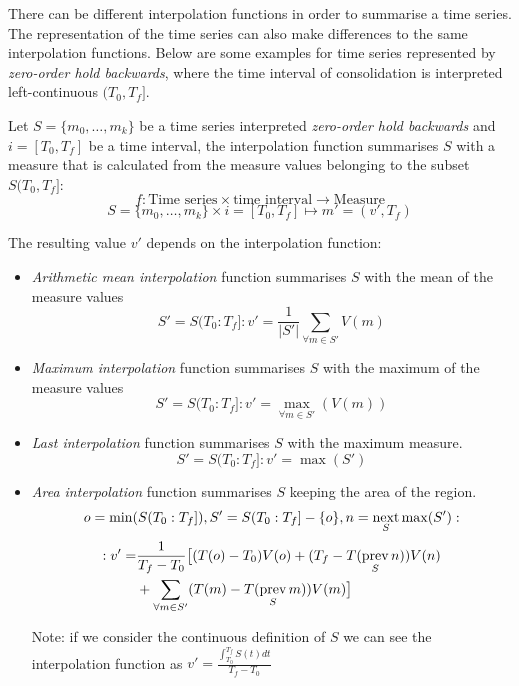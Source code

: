 There can be different interpolation functions in order to summarise a
time series. The representation of the time series can also make
differences to the same interpolation functions. Below are some
examples for time series represented by \emph{zero-order hold
  backwards}, where the time interval of consolidation is interpreted
left-continuous $(T_0,T_f]$.



\begin{definition}
  Let $S=\{m_0,\ldots,m_k\}$ be a time series interpreted
  \emph{zero-order hold backwards} and $i=[T_0,T_f]$ be a time
  interval, the interpolation function summarises $S$ with a measure
  that is calculated from the measure values belonging to the subset
  $S(T_0,T_f]$:
  \[
  f: \text{Time series} \times \text{time interval}
  \longrightarrow \text{Measure}
  \]
  \[
  S=\{m_0,\ldots,m_k\} \times i=[T_0,T_f] \mapsto m'=(v',T_f)
  \]

  The resulting value $v'$ depends on the interpolation function:

\begin{itemize}

\item \emph{Arithmetic mean interpolation} function summarises $S$
  with the mean of the measure values
  \[
  S'=S(T_0:T_f]:
  v' = \frac{1}{|S'|} \sum\limits_{\forall m\in S'} V(m)
  \]

\item \emph{Maximum interpolation} function summarises $S$ with the
  maximum of the measure values
  \[
  S'=S(T_0:T_f]:
  v' = \max_{\forall m \in S'}(V(m))
  \]
\item \emph{Last interpolation} function summarises $S$ with the
  maximum measure.
  \[
  S'=S(T_0:T_f]:
  v' = \max(S')
  \]

\item \emph{Area interpolation} function summarises $S$ keeping the
  area of the region.
  \[
  o=\min(S(T_0:T_f]),
  S'= S(T_0:T_f] - \{o\},
  n=\operatorname*{next}\limits_S \max(S'): 
  \]
  \[
  \begin{split}
  :v'  = & \frac{1}{T_f-T_0} 
  \big[ (T(o)-T_0)V(o) +( T_f- T(\operatorname*{prev}\limits_S n) )V(n) \\
    & {}+\sum\limits_{\forall m \in S'}( T(m)- T(\operatorname*{prev}\limits_S m) )V(m) \big]   
   \end{split}
  \]
  
  Note: if we consider the continuous definition of $S$ we can see the
  interpolation function as $v' = \frac{\int_{T_0}^{T_f} S(t) dt}{T_f
    - T_0}$

\end{itemize}

\end{definition}


